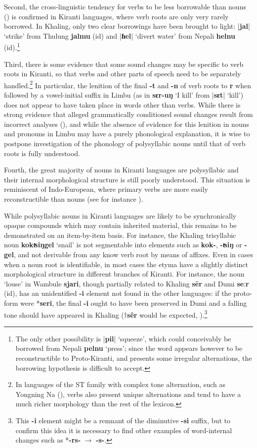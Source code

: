 \documentclass[oneside,a4paper,11pt]{article}
\newcommand{\ipa}[1]{\textbf{{\phon\mbox{#1}}}} %
\newcommand{\dhatu}[2]{|\ipa{#1}| `#2'}
\newcommand{\change}[2]{*\ipa{#1} $\rightarrow$ \ipa{#2}}
\begin{document}
Second, the cross-linguistic tendency for verbs to be less borrowable than nouns (\citealt{wohlgemuth09verbal}) is confirmed in Kiranti languages, where verb roots are only very rarely borrowed. In Khaling, only two clear borrowings have been brought to light: \dhatu{jal}{strike} from Thulung \ipa{jalmu}  (id) and \dhatu{ɦel}{divert water} from Nepali \ipa{helnu} (id).\footnote{The only other possibility is  \dhatu{pil}{squeeze}, which could conceivably be borrowed from Nepali \ipa{pelnu} `press'; since the word appears however to be reconstructible to Proto-Kiranti, and presents some irregular alternations, the borrowing hypothesis is difficult to accept.} 

Third, there is some evidence that some sound changes may be specific to verb roots in Kiranti, so that verbs and other parts of speech need to be separately handled.\footnote{In languages of the ST family with complex tone alternation, such as Yongning Na (\citealt{michaud08na}), verbs also present unique alternations and tend to have a much richer morphology than the rest of the lexicon.} In particular, the lenition of the final \ipa{-t} and \ipa{-n} of verb roots to \ipa{r} when followed by a vowel-initial suffix in Limbu (as in \ipa{sɛr-uŋ}  `I kill' from \dhatu{sɛt}{kill}) does not appear to have taken place in words other than verbs. While there is strong evidence that alleged grammatically conditioned sound changes result from incorrect analyses (\citealt{hill14conditioned}), and while the absence of evidence for this lenition in nouns and pronouns in Limbu may have a purely phonological explanation, it is wise to postpone investigation of the phonology of polysyllabic nouns until that of verb roots is fully understood.

Fourth, the great majority of nouns in Kiranti languages are polysyllabic and their internal morphological structure is still poorly understood. This situation is reminiscent of Indo-European, where primary verbs are more easily reconstructible than nouns (see for instance \citealt{garnier10vocalisme}).

While polysyllabic nouns in Kiranti languages are likely to be synchronically opaque compounds which may contain inherited material, this remains to be demonstrated on an item-by-item basis.  For instance, the Khaling trisyllabic noun \ipa{kokʦiŋgel} `snail' is not segmentable into elements such as \ipa{kok-}, \ipa{-ʦiŋ} or \ipa{-gel}, and not derivable from any know verb root by means of affixes. Even in cases when a noun root is identifiable, in most cases the etyma have a slightly distinct morphological structure in different branches of Kiranti. For instance, the noun `louse' in Wambule \ipa{sjari}, though partially related to Khaling \ipa{sēr} and Dumi \ipa{seːr} (id), has an unidentified \ipa{-i} element not found in the other languages: if the proto-form were *\ipa{seri}, the final \ipa{-i} ought to have been preserved in Dumi and a falling tone should have appeared in Khaling ($\dagger$\ipa{sêr} would be expected, \citealt{jacques16tonogenesis}).\footnote{This \ipa{-i} element might be a remnant of the diminutive \ipa{-si} suffix, but to confirm this idea it is necessary to find other examples of word-internal changes such as \change{-rs-}{-s-}. }
\end{document}
